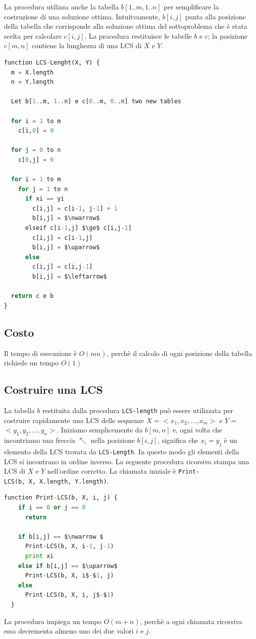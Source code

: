 La procedura utilizza anche la tabella $b[1..m, 1..n]$ per
semplificare la costruzione di una soluzione ottima. Intuitvamente,
$b[i, j]$ punta alla posizione della tabella che corrisponde alla
soluzione ottima del sottoproblema che è stata scelta per calcolare
$c[i,j]$. La procedura restituisce le tabelle $b$ e $c$; la
posizione $c[m,n]$ contiene la lunghezza di una LCS di $X$ e $Y$.\\

\begin{lstlisting}[language=Python, mathescape=true]
function LCS-Lenght(X, Y) {
  m = X.length
  n = Y.length

  Let b[1..m, 1..n] e c[0..m, 0..n] two new tables

  for i = 1 to m
    c[i,0] = 0

  for j = 0 to n
    c[0,j] = 0

  for i = 1 to m
    for j = 1 to n
      if xi == yi
        c[i,j] = c[i-1, j-1] + 1
        b[i,j] = $\nwarrow$
      elseif c[i-1,j] $\ge$ c[i,j-1]
        c[i,j] = c[i-1,j]
        b[i,j] = $\uparrow$
      else 
        c[i,j] = c[i,j-1] 
        b[i,j] = $\leftarrow$

  return c e b
}
\end{lstlisting}

\subsection{Costo}

Il tempo di esecuzione è $O(mn)$, perchè il calcolo di ogni posizione
della tabella richiede un tempo $O(1)$

\subsection{Costruire una LCS}

La tabella $b$ restituita dalla procedura \texttt{LCS-length} può
essere utilizzata per costruire rapidamente una LCS delle sequenze
$X = <x_1, x_2, ..., x_m>$ e $Y$ = $<y_1, y_2, ..., y_n>$.
Iniziamo semplicemente da $b[m,n]$ e, ogni volta che incontriamo una
freccia $\nwarrow $ nella posizione $b[i,j]$, significa che $x_i = y_j$ è
un elemento della LCS trovata da \texttt{LCS-Length}. In questo modo gli
elementi della LCS si incontrano in ordine inverso. La seguente
procedura ricorsiva stampa una LCS di $X$ e $Y$ nell'ordine
corretto. La chiamata iniziale è
\texttt{Print-LCS(b,\ X,\ X.length,\ Y.length)}.\\

\begin{minipage}{\textwidth}
	\begin{lstlisting}[language=Python, mathescape=true]
function Print-LCS(b, X, i, j) {
    if i == 0 or j == 0
      return

    if b[i,j] == $\nwarrow $
      Print-LCS(b, X, i-1, j-1)
      print xi
    else if b[i,j] == $\uparrow$
      Print-LCS(b, X, i$-$1, j)
    else
      Print-LCS(b, X, i, j$-$1)
  }
\end{lstlisting}
\end{minipage}

La procedura impiega un tempo $O(m + n)$, perchè a ogni chiamata
ricorsiva essa decrementa almeno uno dei due valori $i$ e $j$.
